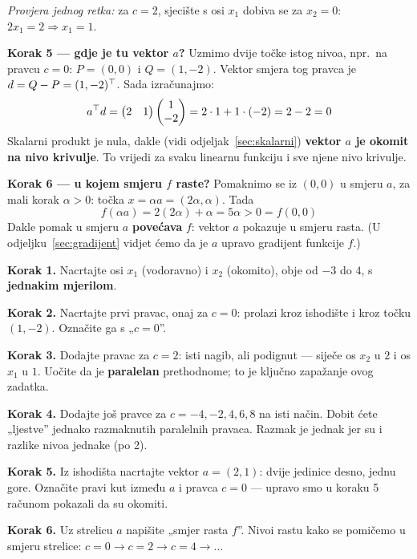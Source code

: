 \begin{zadatak}
\emph{Provjera jednog retka:} za $c = 2$, sjecište s osi $x_1$ dobiva se za
$x_2 = 0$: $2x_1 = 2 \Rightarrow x_1 = 1$. \checkmark

\textbf{Korak 5 --- gdje je tu vektor $a$?} Uzmimo dvije točke istog nivoa,
npr.\ na pravcu $c = 0$: $P = (0,0)$ i $Q = (1,-2)$. Vektor smjera tog pravca
je $d = Q - P = (1,-2)^{\top}$. Sada izračunajmo:
\[
a^{\top} d = \begin{pmatrix} 2 & 1\end{pmatrix}\begin{pmatrix}1 \\ -2\end{pmatrix}
= 2\cdot 1 + 1\cdot(-2) = 2 - 2 = 0
\]
Skalarni produkt je nula, dakle (vidi odjeljak~\ref{sec:skalarni})
\textbf{vektor $a$ je okomit na nivo krivulje}. To vrijedi za svaku linearnu
funkciju i sve njene nivo krivulje.

\textbf{Korak 6 --- u kojem smjeru $f$ raste?} Pomaknimo se iz $(0,0)$ u smjeru
$a$, za mali korak $\alpha > 0$: točka $x = \alpha a = (2\alpha, \alpha)$. Tada
\[
f(\alpha a) = 2(2\alpha) + \alpha = 5\alpha > 0 = f(0,0)
\]
Dakle pomak u smjeru $a$ \textbf{povećava} $f$: vektor $a$ pokazuje u smjeru
rasta. (U odjeljku~\ref{sec:gradijent} vidjet ćemo da je $a$ upravo gradijent
funkcije $f$.)

\begin{crtanje}
\textbf{Korak 1.} Nacrtajte osi $x_1$ (vodoravno) i $x_2$ (okomito), obje od
$-3$ do $4$, s \textbf{jednakim mjerilom}.

\textbf{Korak 2.} Nacrtajte prvi pravac, onaj za $c = 0$: prolazi kroz
ishodište i kroz točku $(1, -2)$. Označite ga s „$c=0$”.

\textbf{Korak 3.} Dodajte pravac za $c = 2$: isti nagib, ali podignut --- siječe
os $x_2$ u $2$ i os $x_1$ u $1$. Uočite da je \textbf{paralelan} prethodnome;
to je ključno zapažanje ovog zadatka.

\textbf{Korak 4.} Dodajte još pravce za $c = -4, -2, 4, 6, 8$ na isti način.
Dobit ćete „ljestve” jednako razmaknutih paralelnih pravaca. Razmak je jednak
jer su i razlike nivoa jednake (po 2).

\textbf{Korak 5.} Iz ishodišta nacrtajte vektor $a = (2,1)$: dvije jedinice
desno, jednu gore. Označite pravi kut između $a$ i pravca $c = 0$ --- upravo
smo u koraku 5 računom pokazali da su okomiti.

\textbf{Korak 6.} Uz strelicu $a$ napišite „smjer rasta $f$”. Nivoi rastu kako
se pomičemo u smjeru strelice: $c=0 \to c=2 \to c=4 \to \dots$


\end{crtanje}
\end{zadatak}
